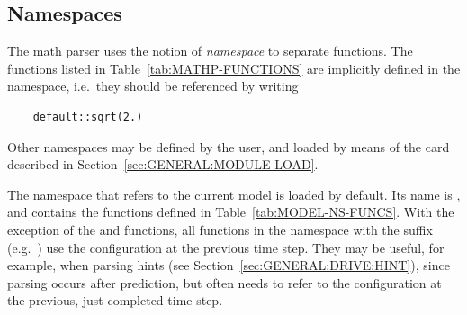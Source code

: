 \subsection{Namespaces}
\label{sec:GENERAL:NAMESPACE}
The math parser uses the notion of \emph{namespace} to separate
functions.
The functions listed in Table~\ref{tab:MATHP-FUNCTIONS}
are implicitly defined in the  namespace, 
i.e.\ they should be referenced by writing
\begin{verbatim}
    default::sqrt(2.)
\end{verbatim}
Other namespaces may be defined by the user, and loaded by means
of the  card described
in Section~\ref{sec:GENERAL:MODULE-LOAD}.

The namespace that refers to the current model is loaded by default.
Its name is , and contains the functions 
defined in Table~\ref{tab:MODEL-NS-FUNCS}.
With the exception of the  and  functions,
all functions in the  namespace
with the suffix  (e.g.\ )
use the configuration at the previous time step.
They may be useful, for example, when parsing hints
(see Section~\ref{sec:GENERAL:DRIVE:HINT}),
since  parsing occurs after prediction,
but often needs to refer to the configuration
at the previous, just completed time step.

